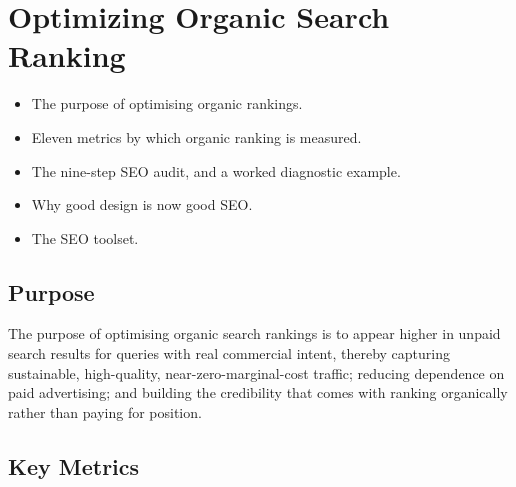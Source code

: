 \chapter{Optimizing Organic Search Ranking}


\begin{learningoutcomes}
\begin{itemize}
\item The purpose of optimising organic rankings.
\item Eleven metrics by which organic ranking is measured.
\item The nine-step SEO audit, and a worked diagnostic example.
\item Why good design is now good SEO.
\item The SEO toolset.
\end{itemize}
\end{learningoutcomes}

\section{Purpose}

\begin{exambox}
The purpose of optimising organic search rankings is to appear higher in unpaid
search results for queries with real commercial intent, thereby capturing
sustainable, high-quality, near-zero-marginal-cost traffic; reducing dependence
on paid advertising; and building the credibility that comes with ranking
organically rather than paying for position.
\end{exambox}

\section{Key Metrics}

